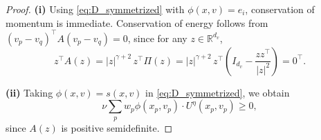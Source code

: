 \documentclass[]{article}
\newcommand{\R}{\mathbb{R}}
\numberwithin{equation}{section}
\newtheorem{theorem}{Theorem}[section]
\begin{document}
\begin{proof}
\textbf{(i)} Using \eqref{eq:D_symmetrized} with $\phi(x,v) = e_i$, conservation of momentum is immediate. Conservation of energy follows from $(v_p - v_q)^\top A(v_p - v_q) = 0$, since for any $z \in \R^{d_v}$,
\begin{equation}
\label{eq:zA_zero}
z^\top A(z) = |z|^{\gamma+2}\, z^\top \Pi(z) = |z|^{\gamma+2}\, z^\top\!\left(I_{d_v} - \frac{zz^\top}{|z|^2}\right) = 0^\top.
\end{equation}

\textbf{(ii)} Taking $\phi(x,v)=s(x,v)$ in \eqref{eq:D_symmetrized}, we obtain
\[
\nu\sum_p w_p  \phi (x_p,v_p)\cdot U^{\eta}(x_p,v_p)\geq 0,
\]
since $A(z)$ is positive semidefinite. 
\end{proof}


\end{document}
